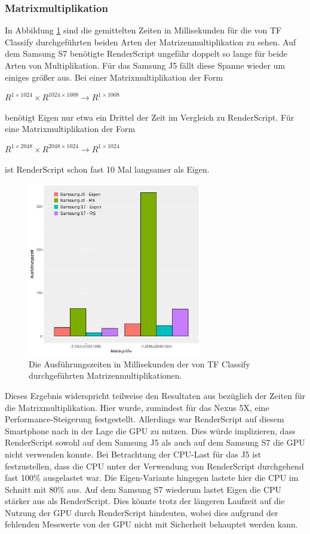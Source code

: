 \subsubsection{Matrixmultiplikation}
\label{subsubsec:matmulauswertung}
In Abbildung \ref{fig:matrizengroesse} sind die gemittelten Zeiten in Millisekunden für die von TF Classify durchgeführten beiden Arten der Matrizenmultiplikation zu sehen. Auf dem Samsung S7 benötigte RenderScript ungefähr doppelt so lange für beide Arten von Multiplikation. Für das Samsung J5 fällt diese Spanne wieder um einiges größer aus. Bei einer Matrixmultiplikation der Form
\begin{center}
	$R^{1 \times 1024} \times R^{1024 \times 1008} \rightarrow R^{1 \times 1008}$
\end{center}
benötigt Eigen nur etwa ein Drittel der Zeit im Vergleich zu RenderScript. Für eine Matrixmultiplikation der Form 
\begin{center}
	$R^{1 \times 2048} \times R^{2048 \times 1024} \rightarrow R^{1 \times 1024}$
\end{center}
ist RenderScript schon fast 10 Mal langsamer als Eigen. 
\begin{figure}[!t]
	\centering
	\includegraphics[width=3.0in]{images/aa-paper-matrizengroesse-legende.jpg}
	\caption{Die Ausführungszeiten in Millisekunden der von TF Classify durchgeführten Matrizenmultiplikationen. }
	\label{fig:matrizengroesse}
\end{figure}
Dieses Ergebnis widerspricht teilweise den Resultaten aus \cite{rstensorflow2017} bezüglich der Zeiten für die Matrixmultiplikation. Hier wurde, zumindest für das Nexus 5X, eine Performance-Steigerung festgestellt. Allerdings war RenderScript auf diesem Smartphone nach \cite{rstensorflow2017} in der Lage die GPU zu nutzen. Dies würde implizieren, dass RenderScript sowohl auf dem Samsung J5 als auch auf dem Samsung S7 die GPU nicht verwenden konnte. Bei Betrachtung der CPU-Last für das J5 ist festzustellen, dass die CPU unter der Verwendung von RenderScript durchgehend fast 100\% ausgelastet war. Die Eigen-Variante hingegen lastete hier die CPU im Schnitt mit 80\% aus. Auf dem Samsung S7 wiederum lastet Eigen die CPU stärker aus als RenderScript. Dies könnte trotz der längeren Laufzeit auf die Nutzung der GPU durch RenderScript hindeuten, wobei dies aufgrund der fehlenden Messwerte von der GPU nicht mit Sicherheit behauptet werden kann. 

